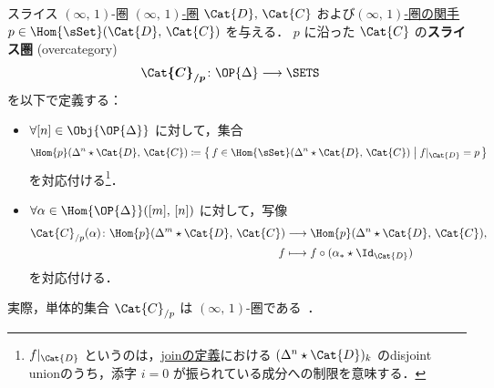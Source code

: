 \documentclass[TQFT_main]{subfiles}
\begin{document}
\begin{mydef}[label=def:overcat-infty,breakable]{スライス {$(\infty,\, 1)$}-圏}
    \hyperref[def:infty-1]{$(\infty,\, 1)$-圏} $\Cat{D},\, \Cat{C}$ および\hyperref[def:infty-1]{$(\infty,\, 1)$-圏の関手} $p \in \Hom{\sSet} (\Cat{D},\, \Cat{C})$ を与える．
    $p$ に沿った $\Cat{C}$ の\textbf{スライス圏} (overcategory) 
    \begin{align}
        \bm{\Cat{C}_{/p}} \colon \OP{\Delta} &\lto \SETS
    \end{align}
    を以下で定義する：
    \begin{itemize}
        \item $\forall [n] \in \Obj{\OP{\Delta}}$ に対して，集合
        \begin{align}
            \Hom{p} (\Delta^n \star \Cat{D},\, \Cat{C})
            \coloneqq \bigl\{\, f \in \Hom{\sSet} (\Delta^n \star \Cat{D},\, \Cat{C}) \bigm| f|_{\Cat{D}} = p \,\bigr\} 
        \end{align}
        を対応付ける\footnote{$f|_{\Cat{D}}$ というのは，\hyperref[def:Simp-Join]{joinの定義}における $(\Delta^n \star \Cat{D})_k$ のdisjoint unionのうち，添字 $i=0$ が振られている成分への制限を意味する．}．
        \item $\forall \alpha \in \Hom{\OP{\Delta}} ([m],\, [n])$ に対して，写像
        \begin{align}
            \Cat{C}_{/p} (\alpha) \colon \Hom{p} (\Delta^m \star \Cat{D},\, \Cat{C}) &\lto \Hom{p} (\Delta^n \star \Cat{D},\, \Cat{C}), \\
            f &\lmto f \circ (\alpha_* \star \Id_{\Cat{D}})
        \end{align}
        を対応付ける．
    \end{itemize}
    実際，単体的集合 $\Cat{C}_{/p}$ は $(\infty,\, 1)$-圏である~\cite[Proposition 4.3.6.1]{Kerodon}．
    
    \tcblower


\end{mydef}
\end{document}
